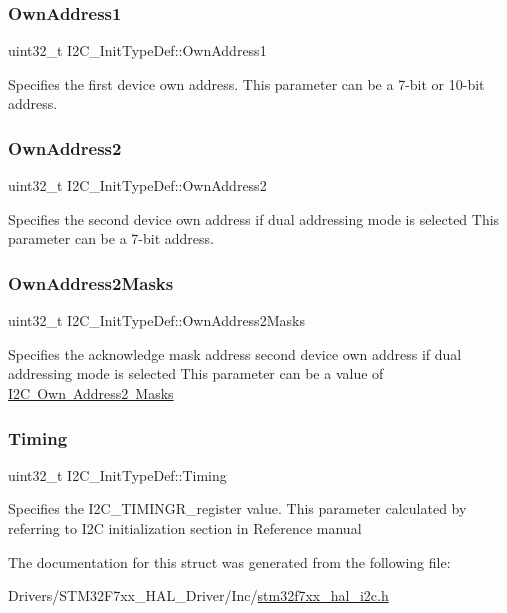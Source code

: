 \subsubsection{\texorpdfstring{OwnAddress1}{OwnAddress1}}
{\footnotesize\ttfamily uint32\+\_\+t I2\+C\+\_\+\+Init\+Type\+Def\+::\+Own\+Address1}

Specifies the first device own address. This parameter can be a 7-\/bit or 10-\/bit address. \mbox{\label{struct_i2_c___init_type_def_a8165caf61b7b52f903edd7517ddaa06b}} 
\subsubsection{\texorpdfstring{OwnAddress2}{OwnAddress2}}
{\footnotesize\ttfamily uint32\+\_\+t I2\+C\+\_\+\+Init\+Type\+Def\+::\+Own\+Address2}

Specifies the second device own address if dual addressing mode is selected This parameter can be a 7-\/bit address. \mbox{\label{struct_i2_c___init_type_def_a2ac60d8926224856693f49c068533ae1}} 
\subsubsection{\texorpdfstring{OwnAddress2Masks}{OwnAddress2Masks}}
{\footnotesize\ttfamily uint32\+\_\+t I2\+C\+\_\+\+Init\+Type\+Def\+::\+Own\+Address2\+Masks}

Specifies the acknowledge mask address second device own address if dual addressing mode is selected This parameter can be a value of \mbox{\hyperlink{group___i2_c___o_w_n___a_d_d_r_e_s_s2___m_a_s_k_s}{I2C Own Address2 Masks}} \mbox{\label{struct_i2_c___init_type_def_a85cf419fd97f82464a6e7396ac0ac1c4}} 
\subsubsection{\texorpdfstring{Timing}{Timing}}
{\footnotesize\ttfamily uint32\+\_\+t I2\+C\+\_\+\+Init\+Type\+Def\+::\+Timing}

Specifies the I2\+C\+\_\+\+T\+I\+M\+I\+N\+G\+R\+\_\+register value. This parameter calculated by referring to I2C initialization section in Reference manual 

The documentation for this struct was generated from the following file\+:\begin{DoxyCompactItemize}
\item 
Drivers/\+S\+T\+M32\+F7xx\+\_\+\+H\+A\+L\+\_\+\+Driver/\+Inc/\mbox{\hyperlink{stm32f7xx__hal__i2c_8h}{stm32f7xx\+\_\+hal\+\_\+i2c.\+h}}\end{DoxyCompactItemize}
